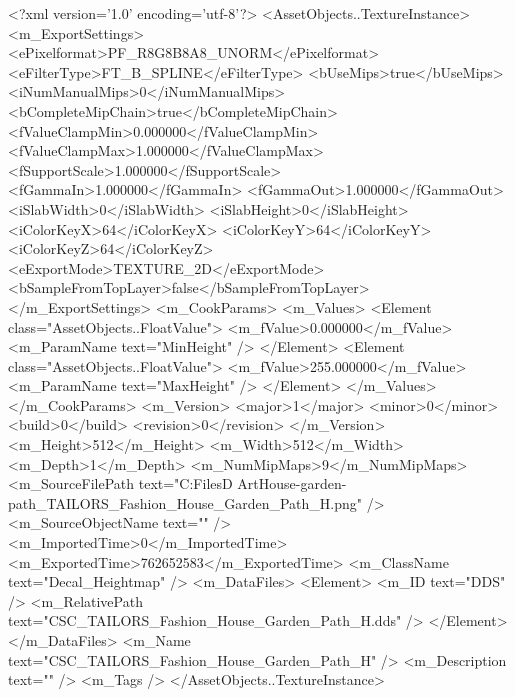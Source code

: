 <?xml version='1.0' encoding='utf-8'?>
<AssetObjects..TextureInstance>
  <m_ExportSettings>
    <ePixelformat>PF_R8G8B8A8_UNORM</ePixelformat>
    <eFilterType>FT_B_SPLINE</eFilterType>
    <bUseMips>true</bUseMips>
    <iNumManualMips>0</iNumManualMips>
    <bCompleteMipChain>true</bCompleteMipChain>
    <fValueClampMin>0.000000</fValueClampMin>
    <fValueClampMax>1.000000</fValueClampMax>
    <fSupportScale>1.000000</fSupportScale>
    <fGammaIn>1.000000</fGammaIn>
    <fGammaOut>1.000000</fGammaOut>
    <iSlabWidth>0</iSlabWidth>
    <iSlabHeight>0</iSlabHeight>
    <iColorKeyX>64</iColorKeyX>
    <iColorKeyY>64</iColorKeyY>
    <iColorKeyZ>64</iColorKeyZ>
    <eExportMode>TEXTURE_2D</eExportMode>
    <bSampleFromTopLayer>false</bSampleFromTopLayer>
  </m_ExportSettings>
  <m_CookParams>
    <m_Values>
      <Element class="AssetObjects..FloatValue">
        <m_fValue>0.000000</m_fValue>
        <m_ParamName text="MinHeight" />
      </Element>
      <Element class="AssetObjects..FloatValue">
        <m_fValue>255.000000</m_fValue>
        <m_ParamName text="MaxHeight" />
      </Element>
    </m_Values>
  </m_CookParams>
  <m_Version>
    <major>1</major>
    <minor>0</minor>
    <build>0</build>
    <revision>0</revision>
  </m_Version>
  <m_Height>512</m_Height>
  <m_Width>512</m_Width>
  <m_Depth>1</m_Depth>
  <m_NumMipMaps>9</m_NumMipMaps>
  <m_SourceFilePath text="C:\Users\Shadow\Desktop\Working Files\3D Art\TAILORS\Fashion House-garden-path\textures\CSC_TAILORS_Fashion_House_Garden_Path_H.png" />
  <m_SourceObjectName text="" />
  <m_ImportedTime>0</m_ImportedTime>
  <m_ExportedTime>762652583</m_ExportedTime>
  <m_ClassName text="Decal_Heightmap" />
  <m_DataFiles>
    <Element>
      <m_ID text="DDS" />
      <m_RelativePath text="CSC_TAILORS_Fashion_House_Garden_Path_H.dds" />
    </Element>
  </m_DataFiles>
  <m_Name text="CSC_TAILORS_Fashion_House_Garden_Path_H" />
  <m_Description text="" />
  <m_Tags />
</AssetObjects..TextureInstance>
